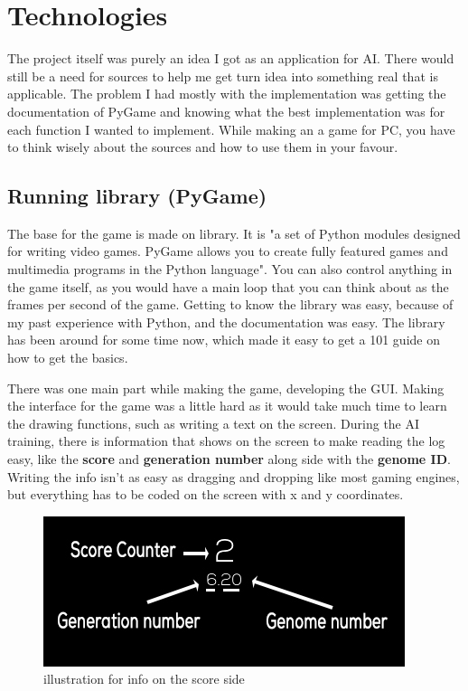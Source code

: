 \chapter{Technologies}

The project itself was purely an idea I got as an application for AI. There would still be a need for sources to help me get turn idea into something real that is applicable. The problem I had mostly with the implementation was getting the documentation of PyGame and knowing what the best implementation was for each function I wanted to implement. While making an a game for PC, you have to think wisely about the sources and how to use them in your favour.

\section{ Running library (PyGame)}
The base for the game is made on  library. It is "a set of Python modules designed for writing video games. PyGame allows you to create fully featured games and multimedia programs in the Python language". You can also control anything in the game itself, as you would have a main loop that you can think about as the frames per second of the game. Getting to know the library was easy, because of my past experience with Python, and the documentation was easy. The library has been around for some time now, which made it easy to get a 101 guide on how to get the basics.



There was one main part while making the game, developing the GUI. Making the interface for the game was a little hard as it would take much time to learn the drawing functions, such as writing a text on the screen. During the AI training, there is information that shows on the screen to make reading the log easy, like the \textbf{score} and \textbf{generation number} along side with the \textbf{genome ID}. Writing the info isn’t as easy as dragging and dropping like most gaming engines, but everything has to be coded on the screen with x and y coordinates.
\begin{figure}[H]
	\centering
	\includegraphics[width=0.7\linewidth]{usedImages/scoreFrame}
	\caption{illustration for info on the score side	}
	\label{fig:scoreframe}
\end{figure}

